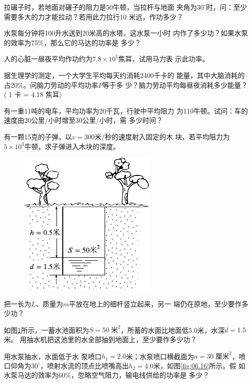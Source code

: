 \begin{exercises}

\exercise 拉碾子时，若地面对碾子的阻力是50牛顿，当拉杆与地面
夹角为$ 30 ^ { \circ } $时，问：至少需要多大的力才能拉动？若用此力拉行10
米远，作功多少？

\exercise 水泵每分钟将100升水送到20米高的水塔，这水泵一小时
内作了多少功？如果水泵的效率为75\%，那么它的马达的功率是
多少？

\exercise 人的心脏一昼夜平均作功约为$ 7.8 \times 10 ^ 5 $焦耳，试用马力表
示此功率。

\exercise 据生理学的测定，一个大学生平均每天约消耗2400千卡的
能量，其中大脑消耗的占20\%。问脑力劳动的平均功率$ P $等于多
少？脑力劳动平均每昼夜消耗多少能量？( 1 卡 = 4.18 焦耳)

\clearpage
\exercise 有一重11吨的电车，平均功率为20千瓦，行驶中平均阻力
为110牛顿。试问：车的速度由20公里/小时增至30公里/小时，需
多少时间？

\exercise 有一颗15克的子弹，以$ v = 300 $米/秒的速度射入固定的木
块，若平均阻力为$ 5 \times 10 ^ { 3 } $牛顿，求子弹进入木块的深度。

\begin{figure}
  \centering
  \includegraphics{figure/fig06.15}
  \caption{}
  \label{fig:06.15}
\end{figure}
\exercise 把一长为$ L $、质量为$ m $平放在地上的细杆竖立起来，另一
端仍在原地，至少要作多少功？

\exercise 如图\ref{fig:06.15}\;所示，一蓄水池面积为$ S = 50 \;\text{米} ^ 2 $，所蓄的水面比地面低5.0米，水深$ d=1.5 $米。
用抽水机把这池里的水全部抽到地面上，至少要作多少功？

\exercise 用水泵抽水，水面低于水
泵喷口$ h _ { 1 } = 2.0 $米；水泵喷口横截面为$ a = 3 0 \;\text{厘米} ^ 2 $，喷口仰角为$
  30 ^ { \circ } $，喷射水流的顶点比喷嘴高出$ h _ { 2 } = 4.0 $米，如图\ref{fig:06.16}\;所示。假
如水泵马达的效率为60\%，忽略空气阻力，输电线供给的功率是
多少？


\end{exercises}
